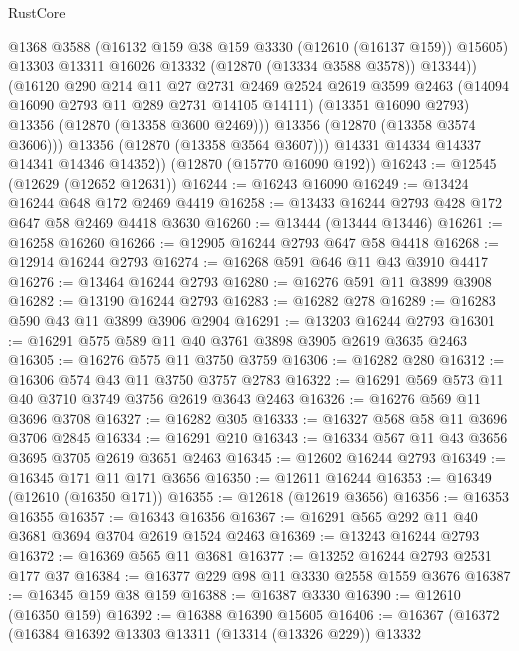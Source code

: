 \begin{lexlean}{RustCore}
\begin{coremodule}
                @1368
                @3588
                (@16132 @159 @38 @159 @3330 (@12610 (@16137 @159)) @15605)
                @13303
                @13311
                @16026
                @13332
                (@12870 (@13334 @3588 @3578))
                @13344))
            (@16120
              @290
              @214
              @11
              @27
              @2731
              @2469
              @2524
              @2619
              @3599
              @2463
              (@14094 @16090 @2793 @11 @289 @2731 @14105 @14111)
              (@13351 @16090 @2793)
              @13356
              (@12870 (@13358 @3600 @2469)))
            @13356
            (@12870 (@13358 @3574 @3606)))
          @13356
          (@12870 (@13358 @3564 @3607)))
        @14331
        @14334
        @14337
        @14341
        @14346
        @14352))
    (@12870 (@15770 @16090 @192))
@16243 := @12545 (@12629 (@12652 @12631))
@16244 := @16243 @16090
@16249 := @13424 @16244 @648 @172 @2469 @4419
@16258 := @13433 @16244 @2793 @428 @172 @647 @58 @2469 @4418 @3630
@16260 := @13444 (@13444 @13446)
@16261 := @16258 @16260
@16266 := @12905 @16244 @2793 @647 @58 @4418
@16268 := @12914 @16244 @2793
@16274 := @16268 @591 @646 @11 @43 @3910 @4417
@16276 := @13464 @16244 @2793
@16280 := @16276 @591 @11 @3899 @3908
@16282 := @13190 @16244 @2793
@16283 := @16282 @278
@16289 := @16283 @590 @43 @11 @3899 @3906 @2904
@16291 := @13203 @16244 @2793
@16301 := @16291 @575 @589 @11 @40 @3761 @3898 @3905 @2619 @3635 @2463
@16305 := @16276 @575 @11 @3750 @3759
@16306 := @16282 @280
@16312 := @16306 @574 @43 @11 @3750 @3757 @2783
@16322 := @16291 @569 @573 @11 @40 @3710 @3749 @3756 @2619 @3643 @2463
@16326 := @16276 @569 @11 @3696 @3708
@16327 := @16282 @305
@16333 := @16327 @568 @58 @11 @3696 @3706 @2845
@16334 := @16291 @210
@16343 := @16334 @567 @11 @43 @3656 @3695 @3705 @2619 @3651 @2463
@16345 := @12602 @16244 @2793
@16349 := @16345 @171 @11 @171 @3656
@16350 := @12611 @16244
@16353 := @16349 (@12610 (@16350 @171))
@16355 := @12618 (@12619 @3656)
@16356 := @16353 @16355
@16357 := @16343 @16356
@16367 := @16291 @565 @292 @11 @40 @3681 @3694 @3704 @2619 @1524 @2463
@16369 := @13243 @16244 @2793
@16372 := @16369 @565 @11 @3681
@16377 := @13252 @16244 @2793 @2531 @177 @37
@16384 := @16377 @229 @98 @11 @3330 @2558 @1559 @3676
@16387 := @16345 @159 @38 @159
@16388 := @16387 @3330
@16390 := @12610 (@16350 @159)
@16392 := @16388 @16390 @15605
@16406 := @16367
    (@16372
      (@16384
        @16392
        @13303
        @13311
        (@13314 (@13326 @229))
        @13332

\end{coremodule}
\end{lexlean}

